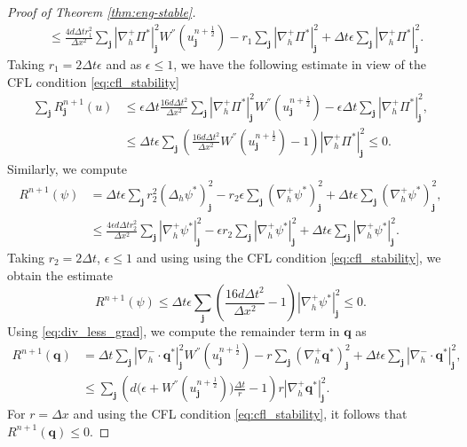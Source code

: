 \documentclass[11pt]{article}
\numberwithin{equation}{section}
\newtheorem{counter example}[theorem]{Counter Example}
\numberwithin{equation}{section}
\numberwithin{equation}{section}
\newcommand{\half}{\frac{1}{2}}
\begin{document}
\begin{proof}[Proof of Theorem  \ref{thm:eng-stable}]
\begin{equation}
\begin{aligned}
&\leq \frac{4d\Delta tr_1^2}{\Delta x^2}\sum_{\mathbf{j}}|\nabla_h^+ \Pi^*|_{\mathbf{j}}^2W^{''}(u_{\mathbf{j}}^{n+\half})-r_1\sum_{\mathbf{j}}|\nabla_h^+ \Pi^*|^2_{\mathbf{j}}+\Delta t \epsilon\sum_{\mathbf{j}}|\nabla_h^+ \Pi^*|_{\mathbf{j}}^2.
\end{aligned}
\end{equation}
Taking $r_1=2\Delta t\epsilon$ and as $\epsilon\leq 1$, we have the following estimate in view of the CFL condition \eqref{eq:cfl_stability}
\begin{equation}
\begin{aligned}
\sum_{\mathbf{j}}R_{\mathbf{j}}^{n+1}(u)&\leq \epsilon\Delta t\frac{16d \Delta t^2}{\Delta x^2} \sum_{\mathbf{j}} |\nabla_h^+ \Pi^*|_{\mathbf{j}}^2W^{''}(u_{\mathbf{j}}^{n+\half})-\epsilon\Delta t \sum_{\mathbf{j}}|\nabla_h^+ \Pi^*|_{\mathbf{j}}^2,\\
&\leq \Delta t\epsilon\sum_{\mathbf{j}}\left(\frac{16 d\Delta t^2}{\Delta x^2}W^{''}(u_{\mathbf{j}}^{n+\half})-1\right)|\nabla_h^+ \Pi^*|_{\mathbf{j}}^2\leq 0.
\end{aligned}
\end{equation}
Similarly, we compute
\begin{equation}
\begin{aligned}
R^{n+1}(\psi)&=\Delta t\epsilon \sum_{\mathbf{j}} r_2^2(\Delta_h \psi^*)_{\mathbf{j}}^2-r_2\epsilon\sum_{\mathbf{j}}(\nabla_h^+ \psi^*)^2_{\mathbf{j}}+\Delta t \epsilon\sum_{\mathbf{j}}(\nabla_h^+ \psi^*)_{\mathbf{j}}^2,\\
&\leq \frac{4\epsilon d \Delta t r_2^2}{\Delta x^2}\sum_{\mathbf{j}}|\nabla_h^+ \psi^*|_{\mathbf{j}}^2-\epsilon r_2\sum_{\mathbf{j}}|\nabla_h^+ \psi^*|^2_{\mathbf{j}}+\Delta t \epsilon\sum_{\mathbf{j}}|\nabla_h^+ \psi^*|_{\mathbf{j}}^2.
\end{aligned}
\end{equation}
Taking $r_2=2\Delta t$, $\epsilon\leq 1$ and using using the CFL condition \eqref{eq:cfl_stability}, we obtain the estimate
\begin{equation}
R^{n+1}(\psi)\leq\Delta t\epsilon\sum_{\mathbf{j}}\left(\frac{16d\Delta t^2}{\Delta x^2}-1\right)|\nabla_h^+ \psi^*|_{\mathbf{j}}^2\leq 0.
\end{equation}
Using \eqref{eq:div_less_grad}, we compute the remainder term in $\mathbf{q}$ as
\begin{equation}
\label{eq:remaind_q-star}
\begin{aligned}
R^{n+1}(\mathbf{q})&=\Delta t \sum_{\mathbf{j}}|\nabla_h^{-} \cdot \mathbf{q}^*|_{\mathbf{j}}^2W^{''}(u_{\mathbf{j}}^{n+\half})-r\sum_{\mathbf{j}}(\nabla_h^+ \mathbf{q}^*)^2_{\mathbf{j}}+\Delta t \epsilon\sum_{\mathbf{j}}|\nabla_h^{-} \cdot \mathbf{q}^*|_{\mathbf{j}}^2,\\
&\leq\sum_{\mathbf{j}}\left(d\big(\epsilon+W^{''}(u_{\mathbf{j}}^{n+\half})\big)\frac{\Delta t}{r}-1\right)r|\nabla_h^{+} \mathbf{q}^*|_{\mathbf{j}}^2.
\end{aligned}
\end{equation}
For $r=\Delta x$ and using the CFL condition \eqref{eq:cfl_stability}, it follows that $R^{n+1}(\mathbf{q})\leq 0$.


\end{proof}
\end{document}
